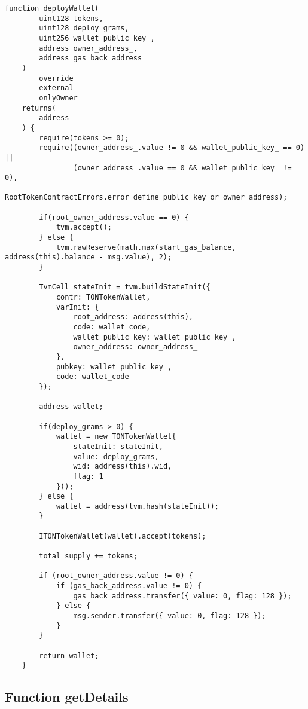 \vspace{2cm}

\begin{lstlisting}[firstnumber=164]
    function deployWallet(
        uint128 tokens,
        uint128 deploy_grams,
        uint256 wallet_public_key_,
        address owner_address_,
        address gas_back_address
    )
        override
        external
        onlyOwner
    returns(
        address
    ) {
        require(tokens >= 0);
        require((owner_address_.value != 0 && wallet_public_key_ == 0) ||
                (owner_address_.value == 0 && wallet_public_key_ != 0),
                RootTokenContractErrors.error_define_public_key_or_owner_address);

        if(root_owner_address.value == 0) {
            tvm.accept();
        } else {
            tvm.rawReserve(math.max(start_gas_balance, address(this).balance - msg.value), 2);
        }

        TvmCell stateInit = tvm.buildStateInit({
            contr: TONTokenWallet,
            varInit: {
                root_address: address(this),
                code: wallet_code,
                wallet_public_key: wallet_public_key_,
                owner_address: owner_address_
            },
            pubkey: wallet_public_key_,
            code: wallet_code
        });

        address wallet;

        if(deploy_grams > 0) {
            wallet = new TONTokenWallet{
                stateInit: stateInit,
                value: deploy_grams,
                wid: address(this).wid,
                flag: 1
            }();
        } else {
            wallet = address(tvm.hash(stateInit));
        }

        ITONTokenWallet(wallet).accept(tokens);

        total_supply += tokens;

        if (root_owner_address.value != 0) {
            if (gas_back_address.value != 0) {
                gas_back_address.transfer({ value: 0, flag: 128 });
            } else {
                msg.sender.transfer({ value: 0, flag: 128 });
            }
        }

        return wallet;
    }
\end{lstlisting}

\subsection{Function getDetails}


